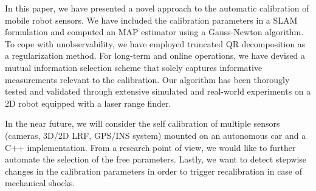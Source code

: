 In this paper, we have presented a novel approach to the automatic calibration
of mobile robot sensors. We have included the calibration parameters in a SLAM
formulation and computed an MAP estimator using a Gauss-Newton algorithm. To
cope with unobservability, we have employed truncated QR decomposition as a
regularization method. For long-term and online operations, we have devised
a mutual information selection scheme that solely captures informative
measurements relevant to the calibration. Our algorithm has been thorougly
tested and validated through extensive simulated and real-world experiments on
a 2D robot equipped with a laser range finder.

In the near future, we will consider the self calibration of multiple sensors
(cameras, 3D/2D LRF, GPS/INS system) mounted on an autonomous car and a C++
implementation. From a research point of view, we would like to further automate
the selection of the free parameters. Lastly, we want to detect stepwise changes
in the calibration parameters in order to trigger recalibration in case of
mechanical shocks.
